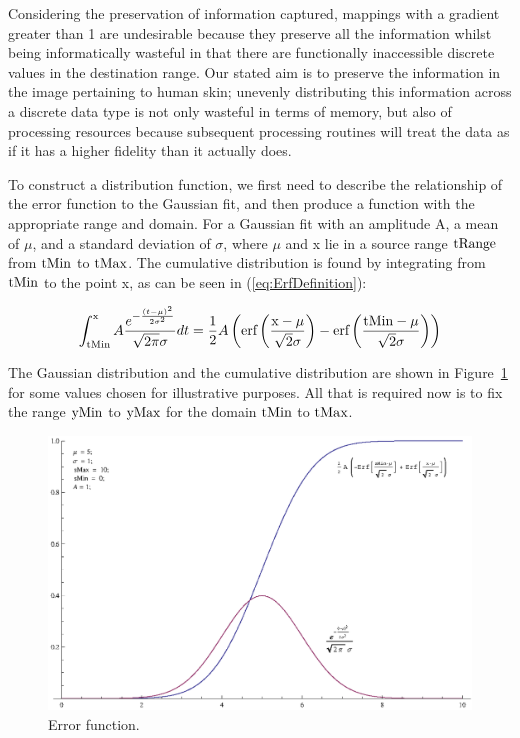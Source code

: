Considering the preservation of information captured, mappings with a gradient greater than 1 are undesirable because they preserve all the information whilst being informatically wasteful in that there are functionally inaccessible discrete values in the destination range. Our stated aim is to preserve the information in the image pertaining to human skin; unevenly distributing this information across a discrete data type is not only wasteful in terms of memory, but also of processing resources because subsequent processing routines will treat the data as if it has a higher fidelity than it actually does.

To construct a distribution function, we first need to describe the relationship of the error function to the Gaussian fit, and then produce a function with the appropriate range and domain. For a Gaussian fit with an amplitude A, a mean of $\mu$, and a standard deviation of $\sigma$, where $\mu$ and x lie in a source range $\text{tRange}$ from $\text{tMin}$ to $\text{tMax}$. The cumulative distribution is found by integrating from $\text{tMin}$ to the point x, as can be seen in (\ref{eq:ErfDefinition}):

\begin{equation}\label{eq:ErfDefinition}
  \int _{\text{tMin}}^{\text{x}} A \frac{e^{-\frac{(t-\mu )^2}{2 \sigma ^2}}}{\sqrt{2 \pi } \sigma }dt=\frac{1}{2} A \left(\text{erf}\left(\frac{\text{x}-\mu }{\sqrt{2} \sigma }\right)-\text{erf}\left(\frac{\text{tMin}-\mu }{\sqrt{2} \sigma }\right)\right)
\end{equation}

The Gaussian distribution and the cumulative distribution are shown in Figure~\ref{fig:ErrorFunctionGraph} for some values chosen for illustrative purposes. All that is required now is to fix the range $\text{yMin}$ to $\text{yMax}$ for the domain $\text{tMin}$ to $\text{tMax}$.

\begin{figure}[h!]
  \caption{Error function.}  \label{fig:ErrorFunctionGraph}
  \centering
    \includegraphics[width=\textwidth]{Chapter2/Figs/errorFunction.eps}
\end{figure}

